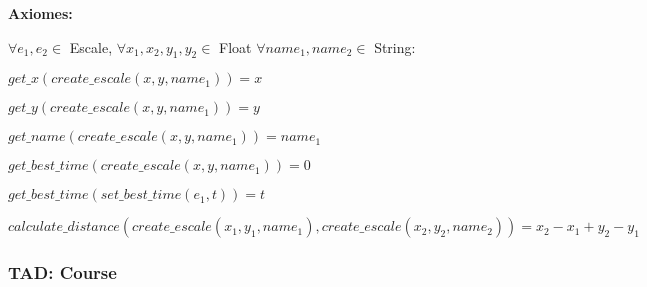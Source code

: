 \documentclass[a4paper, 11pt, oneside]{article}
\begin{document}
\begin{flushleft}
{\begin{minipage}{\textwidth}
      \textbf{Axiomes:}

      \hspace{0.5cm} $\forall e_1, e_2 \in$ Escale, $\forall x_1, x_2, y_1, y_2 \in$ Float 
      $\forall name_1, name_2 \in$ String:

      \hspace{0.5cm} $get\_x(create\_escale(x, y, name_1)) = x$ 

      \hspace{0.5cm} $get\_y(create\_escale(x, y, name_1)) = y$

      \hspace{0.5cm} $get\_name(create\_escale(x, y, name_1)) = name_1$

      \hspace{0.5cm} $get\_best\_time(create\_escale(x, y, name_1)) = 0$

      \hspace{0.5cm} $get\_best\_time(set\_best\_time(e_1, t)) = t$

      \hspace{0.5cm} $calculate\_distance(create\_escale(x_1, y_1, name_1), 
      create\_escale(x_2, y_2, name_2)) = x_2 - x_1 + y_2 - y_1$
      
      \end{minipage}
   }
\end{flushleft}

\subsubsection{TAD: Course}
\end{document}
